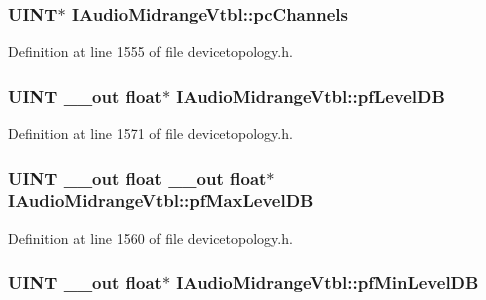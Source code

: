 \subsubsection[{\texorpdfstring{pc\+Channels}{pcChannels}}]{ {\bf U\+I\+NT}$\ast$ I\+Audio\+Midrange\+Vtbl\+::pc\+Channels}\hypertarget{struct_i_audio_midrange_vtbl_a8ae63f95c6a0e78d2dd6ff802d69f947}{}\label{struct_i_audio_midrange_vtbl_a8ae63f95c6a0e78d2dd6ff802d69f947}


Definition at line 1555 of file devicetopology.\+h.

\subsubsection[{\texorpdfstring{pf\+Level\+DB}{pfLevelDB}}]{ {\bf U\+I\+NT} {\bf \+\_\+\+\_\+out} float$\ast$ I\+Audio\+Midrange\+Vtbl\+::pf\+Level\+DB}\hypertarget{struct_i_audio_midrange_vtbl_a84379d22ae1c1201da8a8ad7663b9793}{}\label{struct_i_audio_midrange_vtbl_a84379d22ae1c1201da8a8ad7663b9793}


Definition at line 1571 of file devicetopology.\+h.

\subsubsection[{\texorpdfstring{pf\+Max\+Level\+DB}{pfMaxLevelDB}}]{ {\bf U\+I\+NT} {\bf \+\_\+\+\_\+out} float {\bf \+\_\+\+\_\+out} float$\ast$ I\+Audio\+Midrange\+Vtbl\+::pf\+Max\+Level\+DB}\hypertarget{struct_i_audio_midrange_vtbl_aa232429db6fad449ab80aa31598399c7}{}\label{struct_i_audio_midrange_vtbl_aa232429db6fad449ab80aa31598399c7}


Definition at line 1560 of file devicetopology.\+h.

\subsubsection[{\texorpdfstring{pf\+Min\+Level\+DB}{pfMinLevelDB}}]{ {\bf U\+I\+NT} {\bf \+\_\+\+\_\+out} float$\ast$ I\+Audio\+Midrange\+Vtbl\+::pf\+Min\+Level\+DB}\hypertarget{struct_i_audio_midrange_vtbl_a6318b039c0da4920bf16da37a1c80568}{}\label{struct_i_audio_midrange_vtbl_a6318b039c0da4920bf16da37a1c80568}


